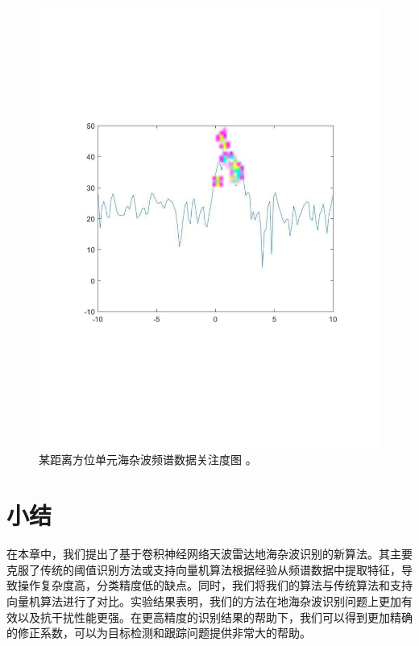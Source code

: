 \begin{figure}[!t]
	\centering
	\includegraphics[width=\textwidth]{figures/heatmap.pdf}
	\caption{某距离方位单元海杂波频谱数据关注度图
	。}
	\label{fig:visfeature}
\end{figure}
\section{小结}
在本章中，我们提出了基于卷积神经网络天波雷达地海杂波识别的新算法。其主要克服了传统的阈值识别方法或支持向量机算法根据经验从频谱数据中提取特征，导致操作复杂度高，分类精度低的缺点。同时，我们将我们的算法与传统算法和支持向量机算法进行了对比。实验结果表明，我们的方法在地海杂波识别问题上更加有效以及抗干扰性能更强。在更高精度的识别结果的帮助下，我们可以得到更加精确的修正系数，可以为目标检测和跟踪问题提供非常大的帮助。